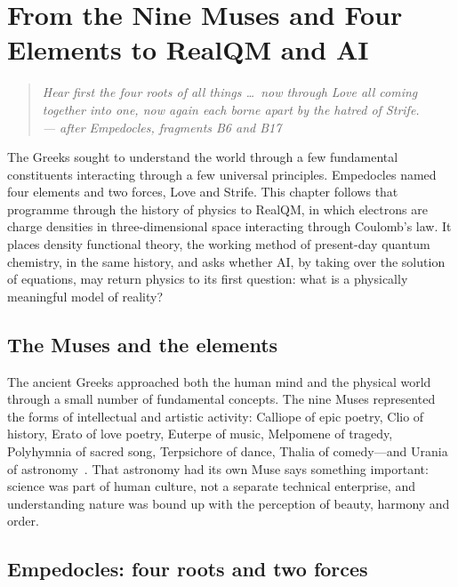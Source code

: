 \chapter{From the Nine Muses and Four Elements to RealQM and AI}\label{ch:muses}

\begin{quote}
\itshape Hear first the four roots of all things \ldots\ now through Love all coming together into one, now
again each borne apart by the hatred of Strife.\\
\normalfont\hfill --- after Empedocles, fragments B6 and B17
\end{quote}
\bigskip

The Greeks sought to understand the world through a few fundamental constituents interacting through a few
universal principles. Empedocles named four elements and two forces, Love and Strife. This chapter follows
that programme through the history of physics to RealQM, in which electrons are charge densities in
three-dimensional space interacting through Coulomb's law. It places density functional theory, the working
method of present-day quantum chemistry, in the same history, and asks whether AI, by taking over the
solution of equations, may return physics to its first question: what is a physically meaningful model of
reality?

\section{The Muses and the elements}\label{sec:muses-elements}

The ancient Greeks approached both the human mind and the physical world through a small number of
fundamental concepts. The nine Muses represented the forms of intellectual and artistic activity: Calliope
of epic poetry, Clio of history, Erato of love poetry, Euterpe of music, Melpomene of tragedy, Polyhymnia of
sacred song, Terpsichore of dance, Thalia of comedy---and Urania of astronomy~\cite{Hesiod}. That astronomy
had its own Muse says something important: science was part of human culture, not a separate technical
enterprise, and understanding nature was bound up with the perception of beauty, harmony and order.

\section{Empedocles: four roots and two forces}\label{sec:empedocles}

